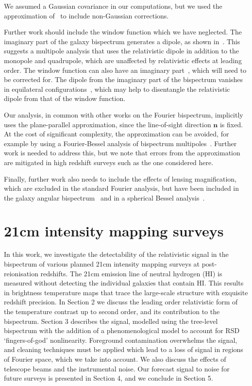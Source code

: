We assumed a Gaussian covariance in our computations, but we used the approximation  of~\cite{Chan:2016ehg} to include non-Gaussian corrections. 

Further work should include the window function which we have  neglected.
The imaginary part of the galaxy bispectrum generates a dipole, as shown in~\cite{Clarkson:2018dwn}. This suggests a multipole analysis that uses the relativistic dipole in addition to the monopole and quadrupole, {which are unaffected by relativistic effects at leading order.} The
window function can also have an imaginary part~\cite{Beutler:2018vpe}, which will need to be corrected for. The dipole from the imaginary part of the bispectrum vanishes in equilateral configurations~\cite{Clarkson:2018dwn}, which may help to disentangle the relativistic dipole from that of the window function.

{Our analysis, in common with other works on the Fourier bispectrum, implicitly uses the plane-parallel approximation, since the line-of-sight direction ${\bm{n}}$ is fixed. At the cost of significant complexity, the approximation can be avoided, for example by using a Fourier-Bessel analysis of bispectrum multipoles~\cite{Castorina:2017inr}. Further work is needed to address this, but we note that errors from the approximation are mitigated in high redshift surveys such as the one considered here.}

Finally, further work also needs to include the effects of lensing magnification, which are excluded in the standard Fourier analysis, but have been included in the galaxy angular bispectrum~\cite{Kehagias:2015tda,DiDio:2015bua, DiDio:2016gpd, DiDio:2018unb} and in a spherical Bessel analysis~\cite{Bertacca:2017dzm}. 
%
%
%
%
%
%
%
%
%
%
%
%
\section{21cm intensity mapping surveys}
%
In this work, we investigate the detectability of the relativistic signal in the bispectrum of various planned 21cm intensity mapping surveys at post-reionisation redshifts. 
The 21cm emission line of neutral hydrogen (HI) is measured without detecting the individual galaxies that contain HI. This results in brightness temperature maps that trace the large-scale structure with exquisite redshift precision. In Section 2 we discuss the leading order relativistic form of the temperature contrast up to second order, and its contribution to the bispectrum. Section 3 describes the signal, modelled using the tree-level bispectrum with the addition of a phenomenological model to account for RSD `fingers-of-god' nonlinearity.
Foreground contamination overwhelms the signal, and cleaning techniques must be applied which lead to a loss of signal in regions of Fourier space, which we take into account. We also discuss the effects of telescope beams and the instrumental noise. Our forecast signal to noise for future surveys is presented in Section 4, and we conclude in Section 5.

